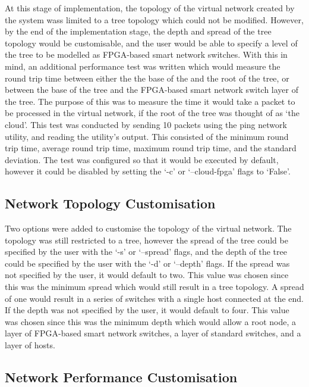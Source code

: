 {At this stage of implementation, the topology of the virtual network created by the system wass limited to a tree topology which could not be modified.
However, by the end of the implementation stage, the depth and spread of the tree topology would be customisable, and the user would be able to specify a level of the tree to be modelled as FPGA-based smart network switches.
With this in mind, an additional performance test was written which would measure the round trip time between either the the base of the and the root of the tree, or between the base of the tree and the FPGA-based smart network switch layer of the tree.
The purpose of this was to measure the time it would take a packet to be processed in the virtual network, if the root of the tree was thought of as `the cloud'.
This test was conducted by sending 10 packets using the ping network utility, and reading the utility's output.
This consisted of the minimum round trip time, average round trip time, maximum round trip time, and the standard deviation.
The test was configured so that it would be executed by default, however it could be disabled by setting the `-c' or `--cloud-fpga' flags to `False'.

\subsection{Network Topology Customisation}
\label{network_topology_customisation}
Two options were added to customise the topology of the virtual network.
The topology was still restricted to a tree, however the spread of the tree could be specified by the user with the `-s' or `--spread' flags, and the depth of the tree could be specified by the user with the `-d' or `--depth' flags.
If the spread was not specified by the user, it would default to two.
This value was chosen since this was the minimum spread which would still result in a tree topology.
A spread of one would result in a series of switches with a single host connected at the end.
If the depth was not specified by the user, it would default to four.
This value was chosen since this was the minimum depth which would allow a root node, a layer of FPGA-based smart network switches, a layer of standard switches, and a layer of hosts.

\subsection{Network Performance Customisation}
\label{network_performance_customisation}

}
